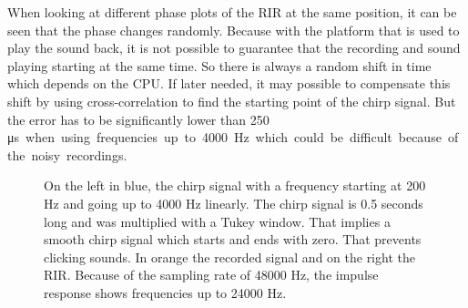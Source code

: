 When looking at different phase plots of the RIR at the same position, it can be seen that the phase changes randomly. Because with the platform that is used to play the sound back, it is not possible to guarantee that the recording and sound playing starting at the same time. So there is always a random shift in time which depends on the CPU. If later needed, it may possible to compensate this shift by using cross-correlation to find the starting point of the chirp signal. But the error has to be significantly lower than 250 \si\micro s when using frequencies up to 4000 Hz which could be difficult because of the noisy recordings.

\begin{figure}[h!]
	\centering	
	\caption{
		On the left in blue, the chirp signal with a frequency starting at 200 Hz and going up to 4000 Hz linearly. The chirp signal is 0.5 seconds long and was multiplied with a Tukey window. That implies a smooth chirp signal which starts and ends with zero. That prevents clicking sounds. In orange the recorded signal and on the right the RIR. Because of the sampling rate of 48000 Hz, the impulse response shows frequencies up to 24000 Hz. 
	}
	\label{fig:signal_response_example}
\end{figure}


